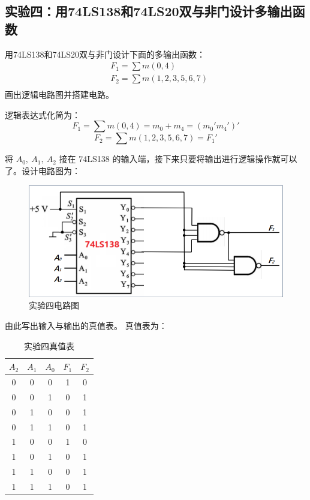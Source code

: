 \documentclass[a4paper,11pt,UTF8]{ctexart}
\begin{document}
\subsection{实验四：用74LS138和74LS20双与非门设计多输出函数}
	\par {\kaishu 用74LS138和74LS20双与非门设计下面的多输出函数：
	\begin{align*}
	 &F_1=\sum m(0,4)\\
	 &F_2=\sum m(1,2,3,5,6,7)\\
	\end{align*}
	画出逻辑电路图并搭建电路。
	}
	\par 逻辑表达式化简为：
	\[ F_1=\sum m(0,4)=m_0+m_4=(m_0'm_4')' \]
	\[ F_2=\sum m(1,2,3,5,6,7)=F_1' \]
	\par 将 $A_0,~A_1,~A_2$ 接在 74LS138 的输入端，接下来只要将输出进行逻辑操作就可以了。设计电路图为：
	\begin{figure}[H]
	 \centering
	 \includegraphics[width=0.5\linewidth]{Exp04}
	 \caption{实验四电路图}
	 \label{fig:exp04}
	\end{figure}
	\par 由此写出输入与输出的真值表。
	真值表为：
	\begin{table}[H]
	 \centering
	 \begin{tabular}{|ccc|cc|}\hline
	  $A_2$&$A_1$&$A_0$ &$F_1$&$F_2$
	  \\\hline
	  0&0&0 &1&0
	  \\\hline
	  0&0&1 &0&1
	  \\\hline
	  0&1&0 &0&1
	  \\\hline
	  0&1&1 &0&1
	  \\\hline
	  1&0&0 &1&0
	  \\\hline
	  1&0&1 &0&1
	  \\\hline
	  1&1&0 &0&1
	  \\\hline
	  1&1&1 &0&1
	  \\\hline
	 \end{tabular}
	 \caption{实验四真值表}
	\end{table}
	
\end{document}
